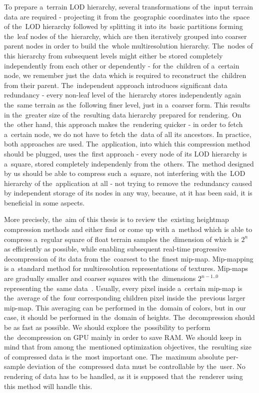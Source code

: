 To prepare a~terrain LOD hierarchy, several transformations of the~input terrain data are required - projecting it from the~geographic coordinates into the~space of the~LOD hierarchy followed by splitting it into its~basic partitions forming the~leaf nodes of the~hierarchy, which are then iteratively grouped into coarser parent nodes in order to build the~whole multiresolution hierarchy. The~nodes of this hierarchy from subsequent levels might either be stored completely independently from each other or dependently - for the~children of a~certain node, we remember just the~data which is required to reconstruct the~children from their parent. The~independent approach introduces significant data redundancy - every non-leaf level of the~hierarchy stores independently again the~same terrain as the~following finer level, just in a~coarser form. This results in the~greater size of the~resulting data hierarchy prepared for rendering. On the~other hand, this approach makes the~rendering quicker - in order to fetch a~certain node, we do not have to fetch the~data of all its ancestors. In practice, both approaches are used. The~application, into which this compression method should be plugged, uses the~first approach - every node of its LOD hierarchy is a~square, stored completely independenly from the~others. The~method designed by us should be able to compress such a~square, not interfering with the~LOD hierarchy of the~application at all - not trying to remove the~redundancy caused by independent storage of its nodes in any way, because, at it has been said, it is beneficial in some aspects.

More precisely, the~aim of this thesis is to review the~existing heightmap compression methods and either find or come up with a~method which is able to compress a~regular square of float terrain samples the~dimension of which is $2^n$ as efficiently as possible, while enabling subsequent real-time progressive decompression of its data from the~coarsest to the~finest mip-map. Mip-mapping is a~standard method for multiresolution representations of textures. Mip-maps are gradually smaller and coarser squares with the~dimensions $2^{n-1 .. 0}$ representing the~same data~\cite{basics}. Usually, every pixel inside a~certain mip-map is the~average of the~four corresponding children pixel inside the~previous larger mip-map. This averaging can be performed in the~domain of colors, but in our case, it should be performed in the~domain of heights. The~decompression should be as fast as possible. We should explore the~possibility to perform the~decompression on GPU mainly in order to save RAM. We should keep in mind that from among the~mentioned optimization objectives, the~resulting size of compressed data is the~most important one. The~maximum absolute per-sample deviation of the~compressed data must be controllable by the~user. No rendering of data has to be handled, as it is supposed that the~renderer using this method will handle this. 

